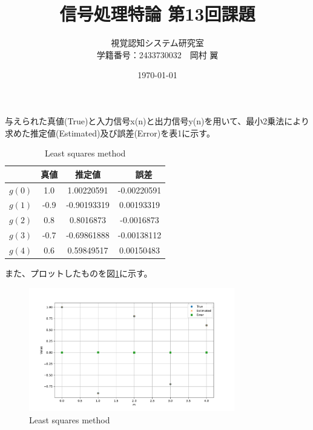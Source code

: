 \documentclass[10pt,dvipdfmx]{jsarticle}
\begin{document}
\title{信号処理特論 第13回課題}
\author{視覚認知システム研究室\\学籍番号：2433730032　岡村 翼}
\date{\today}
\maketitle

{ }
与えられた真値(True)と入力信号x(n)と出力信号y(n)を用いて、最小2乗法により求めた推定値(Estimated)及び誤差(Error)を表1に示す。
    \begin{table}[h]
      \caption{Least squares method}
      \label{a}
      \centering
      \begin{tabular}{|c|c|c|c|} \hline
        & 真値 & 推定値 &　誤差\\ \hline
        $g(0)$ & 1.0 &  1.00220591 &-0.00220591  \\ \hline
        $g(1)$ & -0.9 &  -0.90193319  &0.00193319\\ \hline
        $g(2)$ & 0.8 &  0.8016873 &-0.0016873\\ \hline
        $g(3)$ & -0.7 &  -0.69861888  &-0.00138112 \\ \hline
        $g(4)$ & 0.6 & 0.59849517 &0.00150483\\ \hline
        \end{tabular}
    \end{table}
また、プロットしたものを図\ref{fig:LS1}に示す。\\

  \begin{figure}[h]
    \centering
      \includegraphics[width=0.8\textwidth]{LS1.pdf}
	\caption{Least squares method}
      \label{fig:LS1}
 \end{figure}
\end{document}
